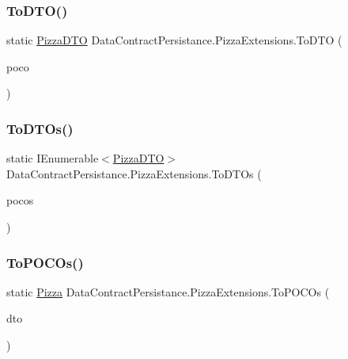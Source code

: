 \subsubsection{\texorpdfstring{To\+D\+T\+O()}{ToDTO()}}
{\footnotesize\ttfamily static \hyperlink{classDataContractPersistance_1_1PizzaDTO}{Pizza\+D\+TO} Data\+Contract\+Persistance.\+Pizza\+Extensions.\+To\+D\+TO (\begin{DoxyParamCaption}\item[{this \hyperlink{classModele_1_1Pizza}{Pizza}}]{poco }\end{DoxyParamCaption})\hspace{0.3cm}{\ttfamily [static]}}

\mbox{\label{classDataContractPersistance_1_1PizzaExtensions_a6baa7ee87577e34d43dad18f5211b66d}} 
\subsubsection{\texorpdfstring{To\+D\+T\+Os()}{ToDTOs()}}
{\footnotesize\ttfamily static I\+Enumerable$<$\hyperlink{classDataContractPersistance_1_1PizzaDTO}{Pizza\+D\+TO}$>$ Data\+Contract\+Persistance.\+Pizza\+Extensions.\+To\+D\+T\+Os (\begin{DoxyParamCaption}\item[{this I\+Enumerable$<$ \hyperlink{classModele_1_1Pizza}{Pizza} $>$}]{pocos }\end{DoxyParamCaption})\hspace{0.3cm}{\ttfamily [static]}}

\mbox{\label{classDataContractPersistance_1_1PizzaExtensions_aa2b658bfc6fd2fd74030dabb09ceddb2}} 
\subsubsection{\texorpdfstring{To\+P\+O\+C\+Os()}{ToPOCOs()}\hspace{0.1cm}{\footnotesize\ttfamily [1/2]}}
{\footnotesize\ttfamily static \hyperlink{classModele_1_1Pizza}{Pizza} Data\+Contract\+Persistance.\+Pizza\+Extensions.\+To\+P\+O\+C\+Os (\begin{DoxyParamCaption}\item[{this \hyperlink{classDataContractPersistance_1_1PizzaDTO}{Pizza\+D\+TO}}]{dto }\end{DoxyParamCaption})\hspace{0.3cm}{\ttfamily [static]}}

